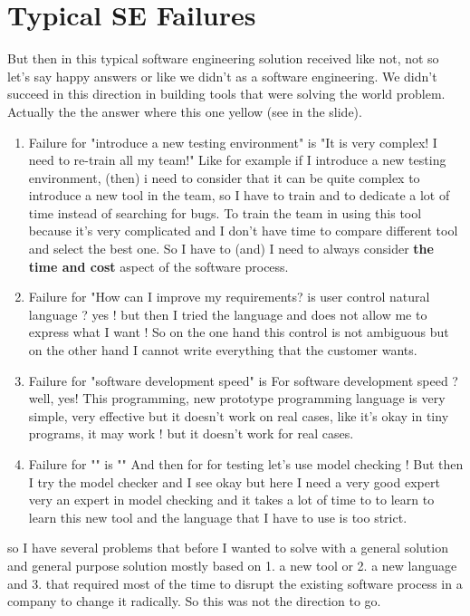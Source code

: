 \documentclass[conference, compsoc, twoside]{IEEEtran}
\begin{document}
\section{Typical SE Failures} %
But then in this typical software engineering solution received like not, not so let's say happy answers or like we didn't as a software engineering.
We didn't succeed in this direction in building tools that were solving the world problem. 
Actually the the answer where this one yellow (see in the slide). 
\begin{enumerate}
	\item Failure for "introduce a new testing environment" is "It is very complex! I need to re-train all my team!"
	Like for example if I introduce a new testing environment, (then) i need to consider that it can be quite complex to introduce a new tool in the team, so I have to train and to dedicate a lot of time instead of searching for bugs. To train the team in using this tool because it's very complicated and I don't have time to compare different tool and select the best one.
	So I have to (and) I need to always consider \textbf{the time and cost} aspect of the software process.
	\item Failure for "How can I improve my requirements? is user control natural language ? yes ! but then I tried the language and does not allow me to express what I want ! So on the one hand this control is not ambiguous but on the other hand I cannot write everything that the customer wants.

	\item Failure for "software development speed" is  For software development speed ? well, yes! This programming, new prototype programming language is very simple, very effective but it doesn't work on real cases, like it's okay in tiny programs, it may work ! 
	but it doesn't work for real cases.
	\item Failure for "" is ""
	And then for for testing let's use model checking ! 
	But then I try the model checker and I see okay but here I need a very good expert very an expert in model checking and it takes a lot of time to to learn to learn this new tool and the language that I have to use is too strict.
\end{enumerate}
so I have several problems that before I wanted to solve with a general solution and general purpose solution mostly based on 
1. a new tool or
2. a new language and 
3. that required most of the time to disrupt the existing software process in a company to change it radically. So this was not the direction to go.
\end{document}
